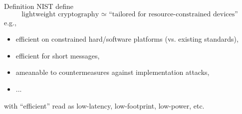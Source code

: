 \documentclass[9pt]{beamer}
\begin{document}

\begin{frame}
\titlepage
\end{frame}




\begin{frame}

\begin{block}{Definition}
NIST define~\cite[Section 3.4]{NIST:LWC:call}
\[
\mbox{lightweight cryptography $\simeq$ ``tailored for resource-constrained devices''}
\]
e.g.,

\begin{itemize}
\item efficient on constrained hard/software platforms (vs. existing standards),
\item efficient for short messages,
\item ameanable to countermeasures against implementation attacks,
\item ...
\end{itemize}

\noindent
with ``efficient'' read as low-latency, low-footprint, low-power, etc.
\end{block}

\end{frame}
\end{document}
